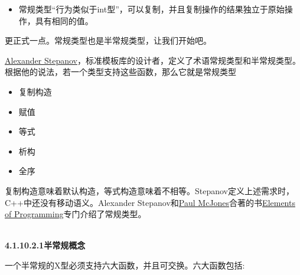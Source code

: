\begin{itemize}
\item
常规类型“行为类似于int型”，可以复制，并且复制操作的结果独立于原始操作，具有相同的值。
\end{itemize}

更正式一点。常规类型也是半常规类型，让我们开始吧。


\begin{tcolorbox}[breakable,enhanced jigsaw,colback=blue!5!white,colframe=blue!75!black,title={常规类型}]

\href{https://en.wikipedia.org/wiki/Alexander_Stepanov}{Alexander Stepanov}，标准模板库的设计者，定义了术语常规类型和半常规类型。根据他的说法，若一个类型支持这些函数，那么它就是常规类型

\begin{itemize}
\item
复制构造

\item
赋值

\item
等式

\item
析构

\item
全序
\end{itemize}

复制构造意味着默认构造，等式构造意味着不相等。Stepanov定义上述需求时，C++中还没有移动语义。Alexander Stepanov和\href{https://www.mcjones.org/paul/}{Paul McJones}合著的书\href{http://elementsofprogramming.com/}{Elements of Programming}专门介绍了常规类型。

\end{tcolorbox}

\hspace*{\fill} \\ %
\noindent
\textbf{4.1.10.2.1\hspace{0.2cm}半常规概念}

一个半常规的X型必须支持六大函数，并且可交换。六大函数包括:

